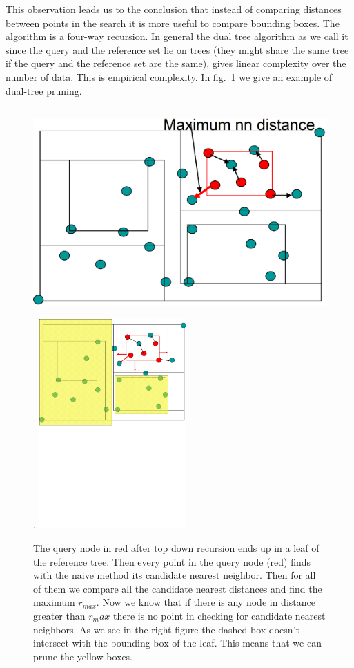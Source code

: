 \documentclass[12pt,letterpaper,doublespaced,ETD,dvips,proposal]{gtthesis}
\begin{document}
\begin{Body}
This observation leads us to the conclusion that instead of
comparing distances between points in the search it is more useful
to compare bounding boxes. The algorithm is  a four-way recursion.
In general the dual tree algorithm as we call it since the query and
the reference set lie on trees (they might share the same tree if
the query and the reference set are the same), gives linear
complexity over the number of data. This is empirical complexity. In
fig.~\ref{dual_tree} we give an example of dual-tree pruning.

\begin{figure}[!htb]
\label{dual_tree}
\centerline{\includegraphics[height=8cm]{dual_tree_box_pruning1.eps},
            \includegraphics[height=8cm]{dual_tree_box_pruning.eps}}
\caption{The query node in red after top down recursion ends up in a leaf of
the reference tree. Then every point in the query node (red) finds
with the naive method its candidate nearest neighbor. Then for all
of them we compare all the candidate nearest distances and find the
maximum $r_{max}$. Now we know that if there is any node in distance
greater than $r_max$ there is no point in checking for candidate
nearest neighbors. As we see in the right figure the dashed box
doesn't intersect with the bounding box of the leaf. This means that
we can prune the yellow boxes.}
\end{figure}


\end{Body}
\end{document}
